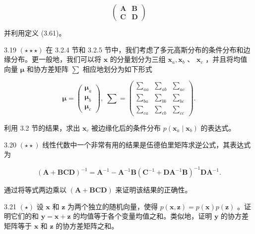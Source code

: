 \documentclass[10pt]{report}
\begin{document}
\[
\left( \begin{array}{ll} \mathbf{A} & \mathbf{B} \\  \mathbf{C} & \mathbf{D} \end{array}\right)  \tag{3.208}
\]

并利用定义 (3.61)。

3.19 \(\left( {\star  \star   \star  }\right)\) 在 3.2.4 节和 3.2.5 节中，我们考虑了多元高斯分布的条件分布和边缘分布。更一般地，我们可以将 \(\mathbf{x}\) 的分量划分为三组 \({\mathbf{x}}_{a},{\mathbf{x}}_{b}\) 、 \({\mathbf{x}}_{c}\) ，并且将均值向量 \(\mathbf{\mu }\) 和协方差矩阵 \(\mathbf{\sum }\) 相应地划分为如下形式

\[
\mathbf{\mu } = \left( \begin{array}{l} {\mathbf{\mu }}_{a} \\  {\mathbf{\mu }}_{b} \\  {\mathbf{\mu }}_{c} \end{array}\right) ,\;\mathbf{\sum } = \left( \begin{array}{lll} {\mathbf{\sum }}_{aa} & {\mathbf{\sum }}_{ab} & {\mathbf{\sum }}_{ac} \\  {\mathbf{\sum }}_{ba} & {\mathbf{\sum }}_{bb} & {\mathbf{\sum }}_{bc} \\  {\mathbf{\sum }}_{ca} & {\mathbf{\sum }}_{cb} & {\mathbf{\sum }}_{cc} \end{array}\right) . \tag{3.209}
\]

利用 3.2 节的结果，求出 \({\mathbf{x}}_{c}\) 被边缘化后的条件分布 \(p\left( {{\mathbf{x}}_{a} \mid  {\mathbf{x}}_{b}}\right)\) 的表达式。

3.20 \(\left( {\star  \star  }\right)\) 线性代数中一个非常有用的结果是伍德伯里矩阵求逆公式，其表达式为

\[
{\left( \mathbf{A} + \mathbf{{BCD}}\right) }^{-1} = {\mathbf{A}}^{-1} - {\mathbf{A}}^{-1}\mathbf{B}{\left( {\mathbf{C}}^{-1} + \mathbf{D}{\mathbf{A}}^{-1}\mathbf{B}\right) }^{-1}\mathbf{D}{\mathbf{A}}^{-1}. \tag{3.210}
\]

通过将等式两边乘以 \(\left( {\mathbf{A} + \mathbf{{BCD}}}\right)\) 来证明该结果的正确性。

3.21 \(\left( \star \right)\) 设 \(\mathbf{x}\) 和 \(\mathbf{z}\) 为两个独立的随机向量，使得 \(p\left( {\mathbf{x},\mathbf{z}}\right)  = p\left( \mathbf{x}\right) p\left( \mathbf{z}\right)\) 。证明它们的和 \(\mathbf{y} = \mathbf{x} + \mathbf{z}\) 的均值等于各个变量均值之和。类似地，证明 \(\mathbf{y}\) 的协方差矩阵等于 \(\mathbf{x}\) 和 \(\mathbf{z}\) 的协方差矩阵之和。
\end{document}
